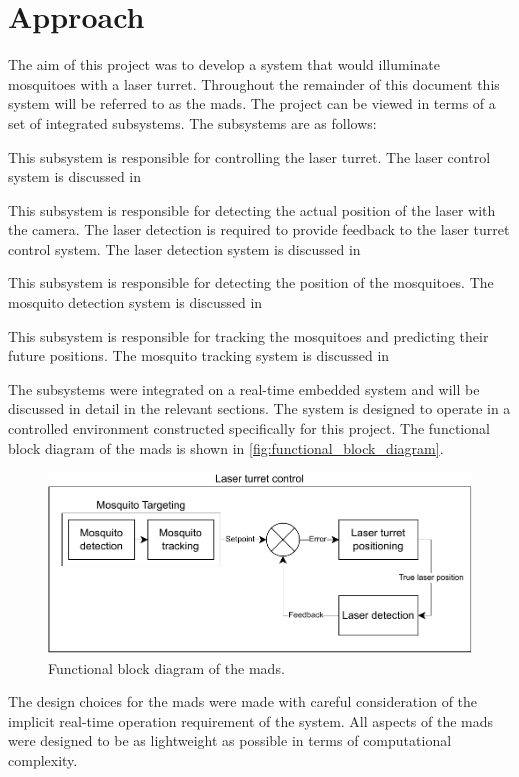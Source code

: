 
\section{Approach}
The aim of this project was to develop a system that would illuminate mosquitoes with a laser turret. Throughout the remainder of this document this system will be referred to as the \gls{mads}. The project can be viewed in terms of a set of integrated subsystems. The subsystems are as follows:
\begin{description}[style=nextline]
      \item[Laser Turret Control System] This subsystem is responsible for controlling the laser turret. The laser control system is discussed in
      \item[Laser Detection System] This subsystem is responsible for detecting the actual position of the laser with the camera. The laser detection is required to provide feedback to the laser turret control system. The laser detection system is discussed in
      \item[Mosquito Detection System] This subsystem is responsible for detecting the position of the mosquitoes. The mosquito detection system is discussed in
      \item[Mosquito Tracking System] This subsystem is responsible for tracking the mosquitoes and predicting their future positions. The mosquito tracking system is discussed in
\end{description}

The subsystems were integrated on a real-time embedded system and will be discussed in detail in the relevant sections. The system is designed to operate in a controlled environment constructed specifically for this project. The functional block diagram of the \gls{mads} is shown in \autoref{fig:functional_block_diagram}.

\begin{figure}[h]
      \centering
      \includegraphics[width=1\textwidth]{figures/function_block_diagram.drawio.pdf}
      \caption{Functional block diagram of the \gls{mads}.}
      \label{fig:functional_block_diagram}
\end{figure}

The design choices for the \gls{mads} were made with careful consideration of the implicit real-time operation requirement of the system. All aspects of the \gls{mads} were designed to be as lightweight as possible in terms of computational complexity.

\newpage


